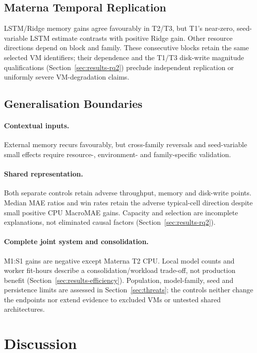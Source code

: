 \documentclass[a4paper,fleqn]{cas-dc}
\begin{document}
\subsection{Materna Temporal Replication}

LSTM/Ridge memory gains agree favourably in T2/T3, but T1's near-zero,
seed-variable LSTM estimate contrasts with positive Ridge gain. Other resource
directions depend on block and family. These consecutive blocks retain the
same selected VM identifiers; their dependence and the T1/T3 disk-write
magnitude qualifications (Section~\ref{sec:results-rq2}) preclude independent
replication or uniformly severe VM-degradation claims.

\subsection{Generalisation Boundaries}

\paragraph{Contextual inputs.}
External memory recurs favourably, but cross-family reversals and seed-variable
small effects require resource-, environment- and family-specific validation.

\paragraph{Shared representation.}
Both separate controls retain adverse throughput, memory and disk-write
points. Median MAE ratios and win rates retain the adverse typical-cell
direction despite small positive CPU MacroMAE gains. Capacity and selection
are incomplete explanations, not eliminated causal factors
(Section~\ref{sec:results-rq2}).

\paragraph{Complete joint system and consolidation.}
M1:S1 gains are negative except Materna T2 CPU. Local model counts and worker
fit-hours describe a consolidation/workload trade-off, not production benefit
(Section~\ref{sec:results-efficiency}). Population, model-family, seed and
persistence limits are assessed in Section~\ref{sec:threats}; the controls
neither change the endpoints nor extend evidence to excluded VMs or untested
shared architectures.

\section{Discussion}
\label{sec:discussion}
\end{document}
